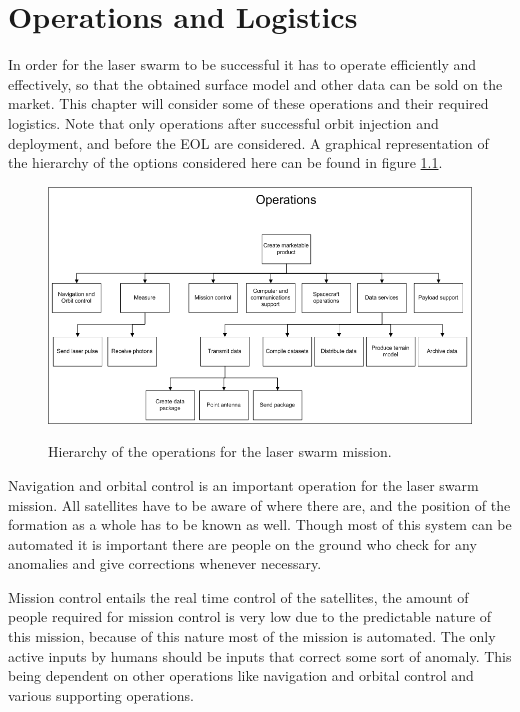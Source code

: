 \chapter{Operations and Logistics}
\label{MTROpsLog}

In order for the laser swarm to be successful it has to operate efficiently and effectively, so that the obtained surface model and other data can be sold on the market. This chapter will consider some of these operations and their required logistics. Note that only operations after successful orbit injection and deployment, and before the \ac{EOL} are considered. A graphical representation of the hierarchy of the options considered here can be found in figure \ref{fig:MTROpsLog}.

\begin{figure}
\centering
\includegraphics[width=1.0\textwidth, angle=0]{chapters/img/MTROpsHier.png}
\label{fig:MTROpsLog}
\caption{Hierarchy of the operations for the laser swarm mission.}
\end{figure}

Navigation and orbital control is an important operation for the laser swarm mission. All satellites have to be aware of where there are, and the position of the formation as a whole has to be known as well. Though most of this system can be automated it is important there are people on the ground who check for any anomalies and give corrections whenever necessary.

Mission control entails the real time control of the satellites, the amount of people required for mission control is very low due to the predictable nature of this mission, because of this nature most of the mission is automated. The only active inputs by humans should be inputs that correct some sort of anomaly. This being dependent on other operations like navigation and orbital control and various supporting operations.

